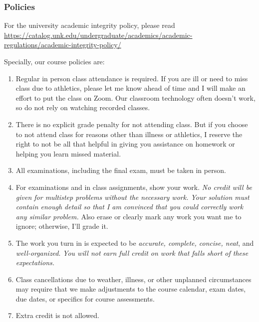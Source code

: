 \documentclass[12pt]{article}
\newcounter{on}\setcounter{on}{0}
\newcounter{ex}\setcounter{ex}{0}
\begin{document}
\subsubsection* {Policies}


For the university academic integrity policy, please read
\small \url{https://catalog.unk.edu/undergraduate/academics/academic-regulations/academic-integrity-policy/}
 
\normalsize
Specially, our course policies are:
\begin{enumerate}

\item Regular in person class attendance is required. If you are ill or need to miss 
class due to athletics, please let me know ahead of time and I will make an effort to put the class on Zoom. 
Our classroom technology often doesn't work, so do not rely on watching recorded classes.

\item There is no explicit grade penalty for not attending class. But if you choose to not attend class for reasons other
than illness or athletics, I reserve the right to not be all that helpful in giving you assistance on homework or helping 
you learn missed material.

\item All examinations, including the final exam, must be taken in person.

\item For examinations and in class assignments, show your work.  \emph{No credit will be given for multistep problems without the necessary work. Your solution must contain enough detail
so that I am convinced that you could correctly work any similar problem.} Also erase or clearly mark any work you want me to ignore; otherwise,
I'll grade it.  

\item The work you turn in is expected to be \emph{accurate, 
complete, concise, neat}, and \emph{well-organized}.  
\emph{You will not earn full credit on work that falls short of 
these expectations.}

\item Class cancellations due to weather, illness, or other 
unplanned circumstances may require that we make  adjustments
to the course calendar, exam dates, due dates, or specifics for 
course assessments. 


\item Extra credit is not allowed. 




\end{enumerate}
\end{document}
